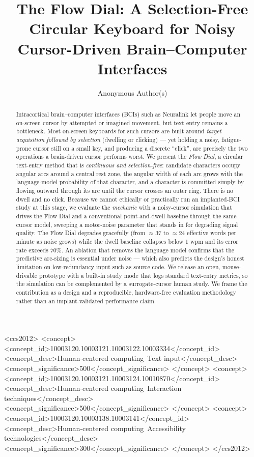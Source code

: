 \documentclass[manuscript,review,anonymous]{acmart}
\begin{document}
\title{The Flow Dial: A Selection-Free Circular Keyboard for Noisy Cursor-Driven Brain--Computer Interfaces}

\author{Anonymous Author(s)}

\renewcommand{\shortauthors}{Anonymous}

\begin{abstract}
Intracortical brain--computer interfaces (BCIs) such as Neuralink let people
move an on-screen cursor by attempted or imagined movement, but text entry
remains a bottleneck. Most on-screen keyboards for such cursors are built around
\emph{target acquisition followed by selection} (dwelling or clicking) --- yet
holding a noisy, fatigue-prone cursor still on a small key, and producing a
discrete ``click'', are precisely the two operations a brain-driven cursor
performs worst. We present the \emph{Flow Dial}, a circular text-entry method
that is \emph{continuous and selection-free}: candidate characters occupy
angular arcs around a central rest zone, the angular width of each arc grows
with the language-model probability of that character, and a character is
committed simply by flowing outward through its arc until the cursor crosses an
outer ring. There is no dwell and no click. Because we cannot ethically or
practically run an implanted-BCI study at this stage, we evaluate the
\emph{mechanic} with a noisy-cursor simulation that drives the Flow Dial and a
conventional point-and-dwell baseline through the same cursor model, sweeping a
motor-noise parameter that stands in for degrading signal quality. The Flow Dial
degrades gracefully (from $\approx$37 to $\approx$24 effective words per minute
as noise grows) while the dwell baseline collapses below 1 wpm and its error
rate exceeds 70\%. An ablation that removes the language model confirms that the
predictive arc-sizing is essential under noise --- which also predicts the
design's honest limitation on low-redundancy input such as source code. We
release an open, mouse-drivable prototype with a built-in study mode that logs
standard text-entry metrics, so the simulation can be complemented by a
surrogate-cursor human study. We frame the contribution as a design and a
reproducible, hardware-free evaluation methodology rather than an
implant-validated performance claim.
\end{abstract}

\begin{CCSXML}
<ccs2012>
 <concept>
  <concept_id>10003120.10003121.10003122.10003334</concept_id>
  <concept_desc>Human-centered computing~Text input</concept_desc>
  <concept_significance>500</concept_significance>
 </concept>
 <concept>
  <concept_id>10003120.10003121.10003124.10010870</concept_id>
  <concept_desc>Human-centered computing~Interaction techniques</concept_desc>
  <concept_significance>500</concept_significance>
 </concept>
 <concept>
  <concept_id>10003120.10003138.10003141</concept_id>
  <concept_desc>Human-centered computing~Accessibility technologies</concept_desc>
  <concept_significance>300</concept_significance>
 </concept>
</ccs2012>
\end{CCSXML}
\end{document}
